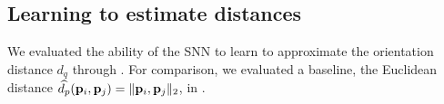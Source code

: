 
\subsection{Learning to estimate distances}\label{sec:results:distance-estimation:learned}



We evaluated the ability of the SNN to learn to approximate the orientation distance $d_q$ through .
For comparison, we evaluated a baseline, the Euclidean distance $\widehat{d_p}(\mathbf{p}_i,\mathbf{p}_j) = \|\mathbf{p}_i, \mathbf{p}_j\|_2$, in .


